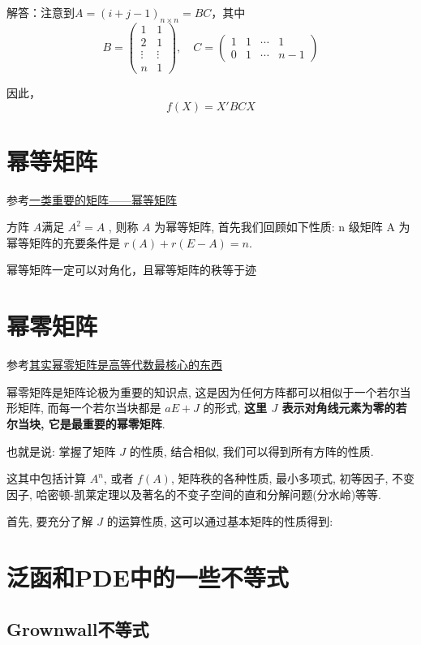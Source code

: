 \documentclass{article}
\begin{document}
解答：注意到$ A = (i+j -1)_{n \times n} = BC$，其中
\[
B = 
\begin{pmatrix}
1 & 1 \\
2 & 1 \\
\vdots & \vdots \\
n & 1
\end{pmatrix}
,\quad
C = 
\begin{pmatrix}
1 & 1 & \cdots & 1 \\
0 & 1 & \cdots & n-1
\end{pmatrix}
\]


因此，
$$ f(X) = X'BCX $$


\section{幂等矩阵}

参考\href{https://mp.weixin.qq.com/s/AwH7uZPmWR2tk6wE5K-j3A}{一类重要的矩阵——幂等矩阵}

方阵 $A$满足 $A^2=A$ , 则称 $A$ 为幂等矩阵, 首先我们回顾如下性质: n 级矩阵 A 为幂等矩阵的充要条件是 $r(A)+r(E-A)=n$.

幂等矩阵一定可以对角化，且幂等矩阵的秩等于迹

\section{幂零矩阵}

参考\href{https://mp.weixin.qq.com/s/ICw_nGdg_U9d8FDTtxD0Jw}{其实幂零矩阵是高等代数最核心的东西}

幂零矩阵是矩阵论极为重要的知识点, 这是因为任何方阵都可以相似于一个若尔当形矩阵, 而每一个若尔当块都是 $aE + J$ 的形式, \textbf{这里 $J$ 表示对角线元素为零的若尔当块, 它是最重要的幂零矩阵}. 
 
也就是说: 掌握了矩阵 $J$ 的性质, 结合相似, 我们可以得到所有方阵的性质. 

这其中包括计算 $A^n$, 或者 $f(A)$, 矩阵秩的各种性质, 最小多项式, 初等因子, 不变因子, 哈密顿-凯莱定理以及著名的不变子空间的直和分解问题(分水岭)等等. 


首先, 要充分了解 $J$ 的运算性质, 这可以通过基本矩阵的性质得到: 


\section{泛函和PDE中的一些不等式}

\subsection{Grownwall不等式}
\end{document}
